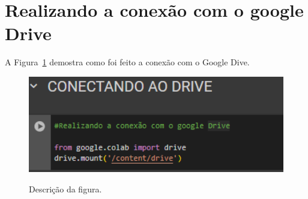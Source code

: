 \section{Realizando a conexão com o google Drive}
	\label{sec:identificao}
\label{sec:figura}
A Figura~\ref{figuras/configuraçao- resumo.png} demostra como foi feito a conexão com o Google Dive.
\begin{figure}[!ht]
\begin{figure}
	\end{figure}
		{\centering
		\caption{Descrição da figura.}
		\includegraphics[width=1.0\textwidth]{figuras/configuraçao- resumo.png}
		\label{figuras/configuraçao- resumo.png}
	}
\end{figure} \\ \\ \\ \\ \\ \\ \\ \\ \\ \\ \\ \\ \\ \\ \\ 

